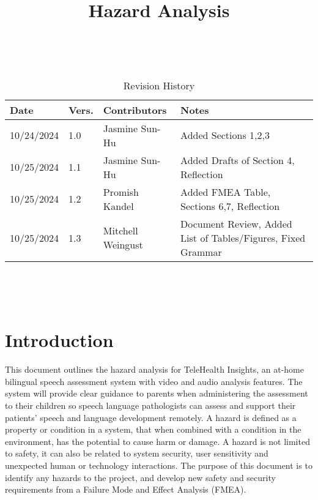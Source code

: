 \documentclass{article}
\title{Hazard Analysis\\\progname}
\author{\authname}
\date{}
\begin{document}
\maketitle
\thispagestyle{empty}

~\newpage


\begin{table}[hp]
\caption{Revision History} \label{TblRevisionHistory}
\begin{tabularx}{\textwidth}{p{1.5cm}p{1cm}p{3.5cm}X}
\toprule {\textbf{Date}} & {\textbf{Vers.}} & {\textbf{Contributors}} & {\textbf{Notes}}\\
\midrule
10/24/2024 & 1.0 & Jasmine Sun-Hu & Added Sections 1,2,3\\
10/25/2024 & 1.1 & Jasmine Sun-Hu & Added Drafts of Section 4, Reflection\\
10/25/2024 & 1.2 & Promish Kandel & Added FMEA Table, Sections 6,7, Reflection\\
10/25/2024 & 1.3 & Mitchell Weingust & Document Review, Added List of Tables/Figures, Fixed Grammar\\
\bottomrule
\end{tabularx}
\end{table}

~\newpage

\tableofcontents
\listoffigures
\listoftables

~\newpage


\section{Introduction}

\hspace{1.5em} This document outlines the hazard analysis for TeleHealth Insights, an at-home bilingual speech 
assessment system with video and audio analysis features. The system will provide clear guidance to
parents when administering the assessment to their children so speech language pathologists can assess and support
their patients' speech and language development remotely. A hazard is defined as a 
property or condition in a system, that when combined with a condition in the environment, has the potential to cause harm or 
damage. A hazard is not limited to safety, it can also be related to system security, user sensitivity and 
unexpected human or technology interactions. The purpose of this document is to identify any hazards to the project, and 
develop new safety and security requirements from a Failure Mode and Effect Analysis (FMEA).
\end{document}
